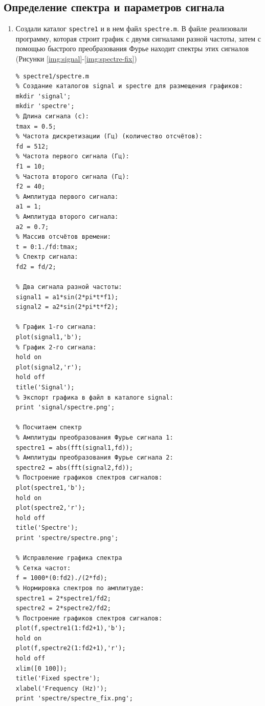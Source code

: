 \subsection{Определение спектра и параметров сигнала}
\begin{enumerate}
    \item Создали каталог \texttt{spectre1} и в нем файл \texttt{spectre.m}.
        В файле реализовали программу, которая строит график с двумя сигналами
        разной частоты, затем с помощью быстрого преобразования Фурье находит спектры
        этих сигналов (Рисунки \ref{img:signal}-\ref{img:spectre-fix})

        \begin{verbatim}
% spectre1/spectre.m
% Создание каталогов signal и spectre для размещения графиков:
mkdir 'signal';
mkdir 'spectre';
% Длина сигнала (с):
tmax = 0.5;
% Частота дискретизации (Гц) (количество отсчётов):
fd = 512;
% Частота первого сигнала (Гц):
f1 = 10;
% Частота второго сигнала (Гц):
f2 = 40;
% Амплитуда первого сигнала:
a1 = 1;
% Амплитуда второго сигнала:
a2 = 0.7;
% Массив отсчётов времени:
t = 0:1./fd:tmax;
% Спектр сигнала:
fd2 = fd/2;

% Два сигнала разной частоты:
signal1 = a1*sin(2*pi*t*f1);
signal2 = a2*sin(2*pi*t*f2);

% График 1-го сигнала:
plot(signal1,'b');
% График 2-го сигнала:
hold on
plot(signal2,'r');
hold off
title('Signal');
% Экспорт графика в файл в каталоге signal:
print 'signal/spectre.png';

% Посчитаем спектр
% Амплитуды преобразования Фурье сигнала 1:
spectre1 = abs(fft(signal1,fd));
% Амплитуды преобразования Фурье сигнала 2:
spectre2 = abs(fft(signal2,fd));
% Построение графиков спектров сигналов:
plot(spectre1,'b');
hold on
plot(spectre2,'r');
hold off
title('Spectre');
print 'spectre/spectre.png';

% Исправление графика спектра
% Сетка частот:
f = 1000*(0:fd2)./(2*fd);
% Нормировка спектров по амплитуде:
spectre1 = 2*spectre1/fd2;
spectre2 = 2*spectre2/fd2;
% Построение графиков спектров сигналов:
plot(f,spectre1(1:fd2+1),'b');
hold on
plot(f,spectre2(1:fd2+1),'r');
hold off
xlim([0 100]);
title('Fixed spectre');
xlabel('Frequency (Hz)');
print 'spectre/spectre_fix.png';
        \end{verbatim}


\end{enumerate}
